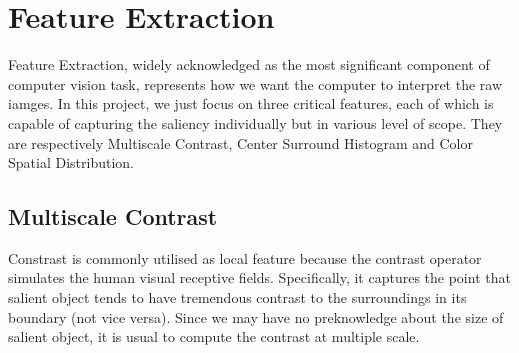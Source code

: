 \documentclass[10pt,twocolumn,letterpaper]{article}
\begin{document}
\section{Feature Extraction}
Feature Extraction, widely acknowledged as the most significant component of computer vision task,
represents how we want the computer to interpret the raw iamges. In this project, we just focus
on three critical features, each of which is capable of capturing the saliency individually but
in various level of scope. They are respectively Multiscale Contrast, Center Surround Histogram 
and Color Spatial Distribution. 
\subsection{Multiscale Contrast}
Constrast is commonly utilised as local feature because the contrast operator simulates
the human visual receptive fields. Specifically, it captures the point that salient object
tends to have tremendous contrast to the surroundings in its boundary (not vice versa).
Since we may have no preknowledge about the size of salient object, it is usual
to compute the contrast at multiple scale. 
\end{document}
